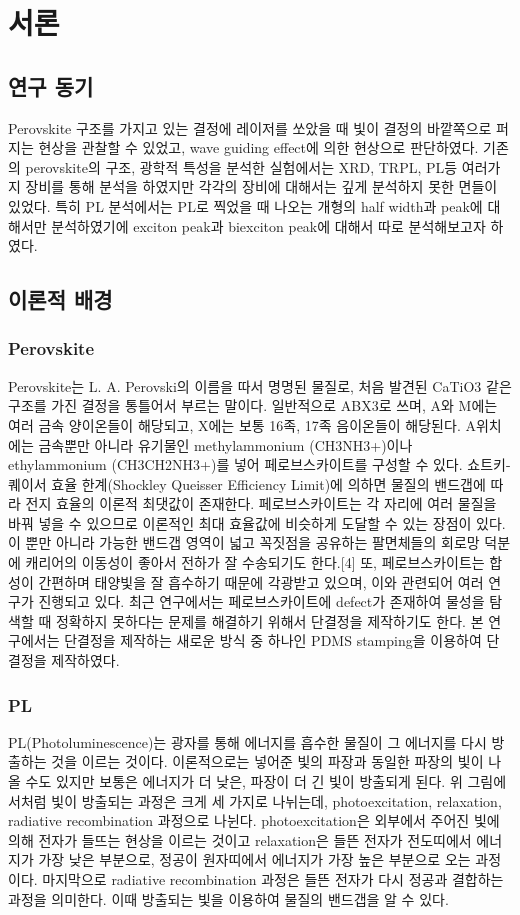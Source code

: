 
\section{서론}
\subsection{연구 동기}
Perovskite 구조를 가지고 있는 결정에 레이저를 쏘았을 때 빛이 결정의 바깥쪽으로 퍼지는 현상을 관찰할 수 있었고, wave guiding effect에 의한 현상으로 판단하였다. 기존의 perovskite의 구조, 광학적 특성을 분석한 실험에서는 XRD, TRPL, PL등 여러가지 장비를 통해 분석을 하였지만 각각의 장비에 대해서는 깊게 분석하지 못한 면들이 있었다. 특히 PL 분석에서는 PL로 찍었을 때 나오는 개형의 half width과 peak에 대해서만 분석하였기에 exciton peak과 biexciton peak에 대해서 따로 분석해보고자 하였다. 
\subsection{이론적 배경}
\subsubsection{Perovskite}
Perovskite는 L. A. Perovski의 이름을 따서 명명된 물질로, 처음 발견된 CaTiO3  같은 구조를 가진 결정을 통틀어서 부르는 말이다. 일반적으로 ABX3로 쓰며, A와 M에는 여러 금속 양이온들이 해당되고, X에는 보통 16족, 17족 음이온들이 해당된다.
A위치에는 금속뿐만 아니라 유기물인  methylammonium (CH3NH3+)이나 ethylammonium (CH3CH2NH3+)를 넣어 페로브스카이트를 구성할 수 있다. 쇼트키-퀘이서 효율 한계(Shockley Queisser Efficiency Limit)에 의하면 물질의 밴드갭에 따라 전지 효율의 이론적 최댓값이 존재한다. 페로브스카이트는 각 자리에 여러 물질을 바꿔 넣을 수 있으므로 이론적인 최대 효율값에 비슷하게 도달할 수  있는 장점이 있다. 이 뿐만 아니라 가능한 밴드갭 영역이 넓고 꼭짓점을 공유하는 팔면체들의 회로망 덕분에 캐리어의 이동성이 좋아서 전하가 잘 수송되기도 한다.[4] 
또, 페로브스카이트는 합성이 간편하며 태양빛을 잘 흡수하기 때문에 각광받고 있으며, 이와 관련되어 여러 연구가 진행되고 있다. 최근 연구에서는 페로브스카이트에 defect가 존재하여 물성을 탐색할 때 정확하지 못하다는 문제를 해결하기 위해서 단결정을 제작하기도 한다. 본 연구에서는 단결정을 제작하는 새로운 방식 중 하나인 PDMS stamping을 이용하여 단결정을 제작하였다.
\subsubsection{PL}
PL(Photoluminescence)는 광자를 통해 에너지를 흡수한 물질이 그 에너지를 다시 방출하는 것을 이르는 것이다. 이론적으로는 넣어준 빛의 파장과 동일한 파장의 빛이 나올 수도 있지만 보통은 에너지가 더 낮은, 파장이 더 긴 빛이 방출되게 된다. 
위 그림에서처럼 빛이 방출되는 과정은 크게 세 가지로 나뉘는데, photoexcitation, relaxation, radiative recombination 과정으로 나뉜다. photoexcitation은 외부에서 주어진 빛에 의해 전자가 들뜨는 현상을 이르는 것이고 relaxation은 들뜬 전자가 전도띠에서 에너지가 가장 낮은 부분으로, 정공이 원자띠에서 에너지가 가장 높은 부분으로 오는 과정이다. 마지막으로 radiative recombination 과정은 들뜬 전자가 다시 정공과 결합하는 과정을 의미한다. 이때 방출되는 빛을 이용하여 물질의 밴드갭을 알 수 있다.
